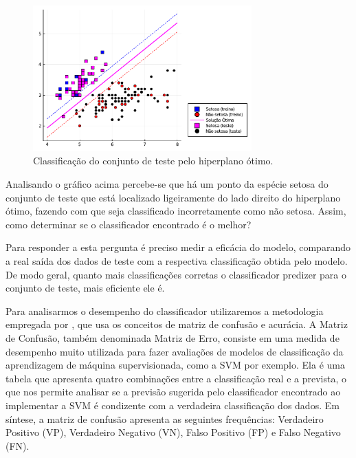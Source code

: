 \documentclass[12pt,a4paper]{scrartcl}
\theoremstyle{definition}%
\newcommand{\prompt}[4]{
        \ttfamily\llap{{\color{#2}[#3]:\hspace{3pt}#4}}\vspace{-\baselineskip}
    }
\begin{document}
            
{%

     \begin{figure}
         \centering
         \includegraphics[width=0.75\textwidth]{Implementacao_de_SVM_em_Julia_TCC_files/Implementacao_de_SVM_em_Julia_TCC_20_0.pdf}
         \caption{Classificação do conjunto de teste pelo hiperplano ótimo.}
         \label{fig:classificacao_conjunto_teste_margem_rigida}
     \end{figure}
    } 

Analisando o gráfico acima percebe-se que há um ponto da espécie setosa
do conjunto de teste que está localizado ligeiramente do lado direito do
hiperplano ótimo, fazendo com que seja classificado incorretamente como
não setosa. Assim, como determinar se o classificador encontrado é o
melhor?

Para responder a esta pergunta é preciso medir a eficácia do modelo,
comparando a real saída dos dados de teste com a respectiva
classificação obtida pelo modelo. De modo geral, quanto mais
classificações corretas o classificador predizer para o conjunto de
teste, mais eficiente ele é.

Para analisarmos o desempenho do classificador utilizaremos a metodologia empregada por \textcite{Evelin2017}, que usa os conceitos de matriz de confusão e acurácia. A Matriz de Confusão, também denominada Matriz de Erro, consiste em uma medida de desempenho muito utilizada para fazer avaliações de modelos de classificação da aprendizagem de máquina supervisionada, como a SVM por exemplo. Ela é uma tabela que apresenta quatro combinações entre a classificação real e a prevista, o que nos permite analisar se a previsão sugerida pelo classificador encontrado ao implementar a SVM é condizente com a verdadeira classificação dos dados. Em síntese, a matriz de confusão apresenta as seguintes frequências: Verdadeiro Positivo (VP), Verdadeiro Negativo (VN), Falso Positivo (FP) e Falso Negativo (FN).
\end{document}
